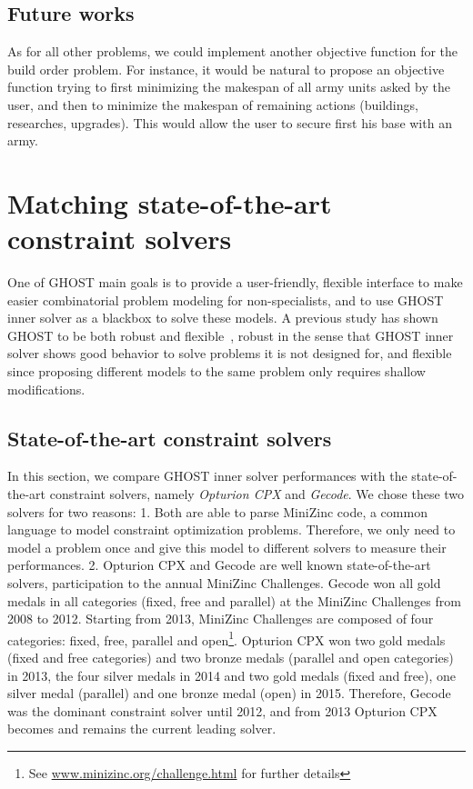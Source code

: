 \documentclass[journal]{IEEEtran}
\newcommand{\ghost}{\textsc{GHOST}\xspace}
\begin{document}
\subsection{Future works}

As  for  all other  problems,  we  could implement  another  objective
function  for the  build  order  problem. For  instance,  it would  be
natural to  propose an objective  function trying to  first minimizing
the makespan of all army units asked by the user, and then to minimize
the   makespan   of    remaining   actions   (buildings,   researches,
upgrades). This would allow the user  to secure first his base with an
army.


\section{Matching state-of-the-art constraint solvers}\label{sec:SOTA}

One  of \ghost  main goals  is  to provide  a user-friendly,  flexible
interface   to  make   easier  combinatorial   problem  modeling   for
non-specialists, and to use \ghost inner solver as a blackbox to solve
these models. A previous study has  shown \ghost to be both robust and
flexible~\cite{aiide15_rts},  robust in  the sense  that \ghost  inner
solver shows good  behavior to solve problems it is  not designed for,
and flexible since proposing different models to the same problem only
requires shallow modifications.

\subsection{State-of-the-art constraint solvers}

In this section, we compare  \ghost inner solver performances with the
state-of-the-art  constraint solvers,  namely {\it  Opturion CPX}  and
{\it Gecode}.  We chose these  two solvers  for two reasons:  1. Both
are able to parse MiniZinc code, a common language to model constraint
optimization problems. Therefore, we only need to model a problem once
and  give   this  model   to  different   solvers  to   measure  their
performances.   2.   Opturion   CPX   and  Gecode   are   well   known
state-of-the-art  solvers,   participation  to  the   annual  MiniZinc
Challenges.   Gecode won  all gold  medals in  all categories  (fixed,
free and parallel) at the
MiniZinc Challenges from  2008 to 2012.  Starting  from 2013, MiniZinc
Challenges are composed of four  categories: fixed, free, parallel and
open\footnote{See
  \href{http://www.minizinc.org/challenge.html}{www.minizinc.org/challenge.html}
  for further details}. Opturion CPX won two gold
medals (fixed  and free  categories) and  two bronze  medals (parallel
and open categories)  in 2013, the four silver medals  in 2014 and two
gold  medals (fixed  and free),  one silver  medal (parallel)  and one
bronze  medal  (open) in  2015.  Therefore,  Gecode was  the  dominant
constraint solver until  2012, and from 2013 Opturion  CPX becomes and
remains the current leading solver.
\end{document}
